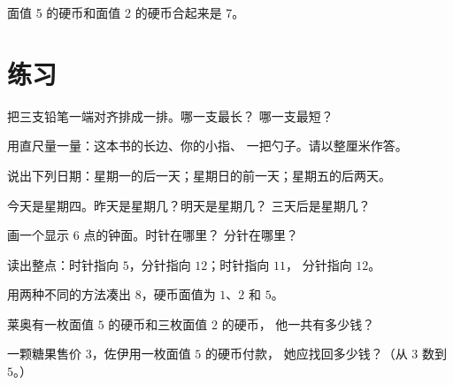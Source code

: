 \begin{omfigure}

{\small 面值 5 的硬币和面值 2 的硬币合起来是 7。}
\end{omfigure}

\section{练习}

\begin{exercise}[$\star$]\label{exo:g1:measure:1}
把三支铅笔一端对齐排成一排。哪一支最长？
哪一支最短？
\end{exercise}

\begin{exercise}[$\star$]\label{exo:g1:measure:2}
用直尺量一量：这本书的长边、你的小指、
一把勺子。请以整厘米作答。
\end{exercise}

\begin{exercise}[$\star$]\label{exo:g1:measure:3}
说出下列日期：星期一的后一天；星期日的前一天；星期五的后两天。
\end{exercise}

\begin{exercise}[$\star$]\label{exo:g1:measure:4}
今天是星期四。昨天是星期几？明天是星期几？
三天后是星期几？
\end{exercise}

\begin{exercise}[$\star$]\label{exo:g1:measure:5}
画一个显示 $6$ 点的钟面。时针在哪里？
分针在哪里？
\end{exercise}

\begin{exercise}[$\star$]\label{exo:g1:measure:6}
读出整点：时针指向 $5$，分针指向 $12$；时针指向 $11$，
分针指向 $12$。
\end{exercise}

\begin{exercise}[$\star$]\label{exo:g1:measure:7}
用两种不同的方法凑出 $8$，硬币面值为 $1$、$2$ 和 $5$。
\end{exercise}

\begin{exercise}[$\star$]\label{exo:g1:measure:8}
莱奥有一枚面值 $5$ 的硬币和三枚面值 $2$ 的硬币，
他一共有多少钱？
\end{exercise}

\begin{exercise}[$\star\star$]\label{exo:g1:measure:9}
一颗糖果售价 $3$，佐伊用一枚面值 $5$ 的硬币付款，
她应找回多少钱？（从 $3$ 数到 $5$。）
\end{exercise}
